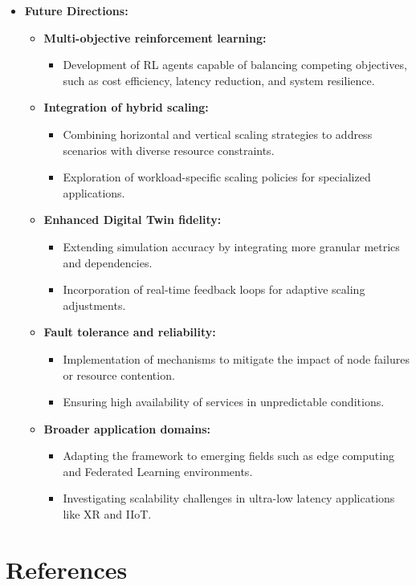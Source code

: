 \documentclass[conference]{IEEEtran}
\begin{document}
\begin{itemize}
    \item \textbf{Future Directions:}
    \begin{itemize}
        \item \textbf{Multi-objective reinforcement learning:}
        \begin{itemize}
            \item Development of RL agents capable of balancing competing objectives, such as cost efficiency, latency reduction, and system resilience.
        \end{itemize}
        \item \textbf{Integration of hybrid scaling:}
        \begin{itemize}
            \item Combining horizontal and vertical scaling strategies to address scenarios with diverse resource constraints.
            \item Exploration of workload-specific scaling policies for specialized applications.
        \end{itemize}
        \item \textbf{Enhanced Digital Twin fidelity:}
        \begin{itemize}
            \item Extending simulation accuracy by integrating more granular metrics and dependencies.
            \item Incorporation of real-time feedback loops for adaptive scaling adjustments.
        \end{itemize}
        \item \textbf{Fault tolerance and reliability:}
        \begin{itemize}
            \item Implementation of mechanisms to mitigate the impact of node failures or resource contention.
            \item Ensuring high availability of services in unpredictable conditions.
        \end{itemize}
        \item \textbf{Broader application domains:}
        \begin{itemize}
            \item Adapting the framework to emerging fields such as edge computing and Federated Learning environments.
            \item Investigating scalability challenges in ultra-low latency applications like XR and IIoT.
        \end{itemize}
    \end{itemize}
\end{itemize}


\section*{References}

% 



\end{document}
